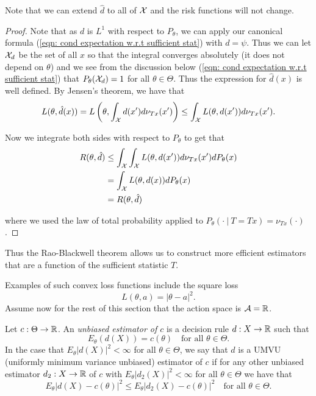 \documentclass[twoside, a4paper, 10pt]{amsart}
\begin{document}
Note that we can extend $\hat{d}$ to all of $\mathcal{X}$ and the risk functions will not change.

\begin{proof} Note that as $d$ is $L^1$ with respect to $P_{\theta}$, we can apply our canonical formula (\ref{eqn: cond expectation w.r.t sufficient stat}) with $d = \psi$. Thus we can let $\mathcal{X}_d$ be the set of all $x$ so that the integral converges absolutely (it does not depend on $\theta$) and we see from the discussion below (\ref{eqn: cond expectation w.r.t sufficient stat}) that $P_{\theta}(\mathcal{X}_d) = 1$ for all $\theta \in \Theta$. Thus the expression for $\hat{d}(x)$ is well defined. 
By Jensen's theorem, we have that 
$$L(\theta, \hat{d}(x)) = L\left(\theta, \int_{\mathcal{X}} d(x') d\nu_{Tx}(x') \right) \leq \int_{\mathcal{X}} L(\theta, d(x')) d\nu_{Tx}(x')  .$$

Now we integrate both sides with respect to $P_{\theta}$ to get that 
\begin{align*}R(\theta, \hat{d}) &\leq \int_{\mathcal{X}} \int_{\mathcal{X}} L(\theta, d(x')) d\nu_{Tx}(x')  dP_{\theta}(x)\\
&= \int_{\mathcal{X}} L(\theta, d(x)) dP_{\theta}(x) \\
&= R(\theta, \hat{d})   \end{align*}

where we used the law of total probability applied to $P_{\theta}(\cdot ~|~T=Tx) = \nu_{Tx}(\cdot)$. \end{proof}

Thus the Rao-Blackwell theorem allows us to construct more efficient estimators that are a function of the sufficient statistic $T$.

Examples of such convex loss functions include the square loss $$L(\theta, a) = |\theta - a|^2.$$ Assume now for the rest of this section that the action space is $\mathcal{A} = \mathbb{R}$.

\begin{mydef} Let $c:\Theta \to \mathbb{R}$. An \textit{unbiased estimator of $c$} is a decision rule $d:X \to \mathbb{R}$ such that $$E_{\theta}(d(X)) = c(\theta) \quad\text{for all } \theta \in \Theta.$$ In the case that $E_{\theta}|d(X)|^2 < \infty$ for all $\theta \in \Theta$, we say that $d$ is a UMVU (uniformly minimum variance unbiased) estimator of $c$ if for any other unbiased estimator $d_2:X \to \mathbb{R}$ of $c$ with $E_{\theta}|d_2(X)|^2 < \infty$ for all $\theta \in \Theta$ we have that  $$E_{\theta}|d(X) - c(\theta)|^2 \leq E_{\theta}|d_2(X) - c(\theta)|^2 \quad \text{for all } \theta \in \Theta.$$

\end{mydef}
\end{document}
